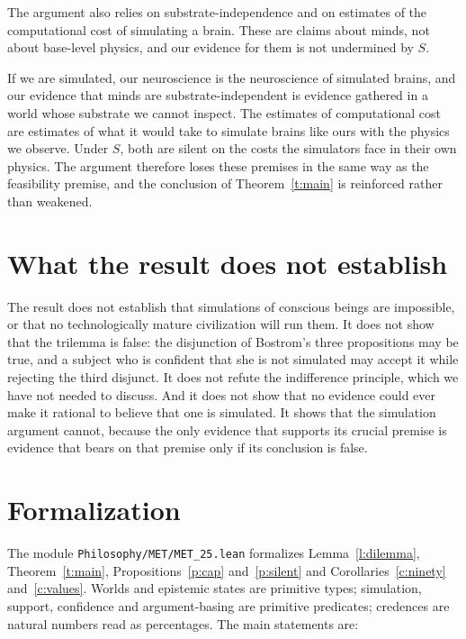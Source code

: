 \documentclass{situationist-preprint}
\begin{document}
\begin{objection}[Neuroscience]
The argument also relies on substrate-independence and on estimates of the computational cost of simulating a brain. These are claims about minds, not about base-level physics, and our evidence for them is not undermined by $S$.
\end{objection}

\begin{reply}
If we are simulated, our neuroscience is the neuroscience of simulated brains, and our evidence that minds are substrate-independent is evidence gathered in a world whose substrate we cannot inspect. The estimates of computational cost are estimates of what it would take to simulate brains like ours with the physics we observe. Under $S$, both are silent on the costs the simulators face in their own physics. The argument therefore loses these premises in the same way as the feasibility premise, and the conclusion of Theorem~\ref{t:main} is reinforced rather than weakened.
\end{reply}

\section{What the result does not establish}

The result does not establish that simulations of conscious beings are impossible, or that no technologically mature civilization will run them. It does not show that the trilemma is false: the disjunction of Bostrom's three propositions may be true, and a subject who is confident that she is not simulated may accept it while rejecting the third disjunct. It does not refute the indifference principle, which we have not needed to discuss. And it does not show that no evidence could ever make it rational to believe that one is simulated. It shows that the simulation argument cannot, because the only evidence that supports its crucial premise is evidence that bears on that premise only if its conclusion is false.

\section{Formalization}

The module \nolinkurl{Philosophy/MET/MET_25.lean} formalizes Lemma~\ref{l:dilemma}, Theorem~\ref{t:main}, Propositions~\ref{p:cap} and~\ref{p:silent} and Corollaries~\ref{c:ninety} and~\ref{c:values}. Worlds and epistemic states are primitive types; simulation, support, confidence and argument-basing are primitive predicates; credences are natural numbers read as percentages. The main statements are:
\end{document}
